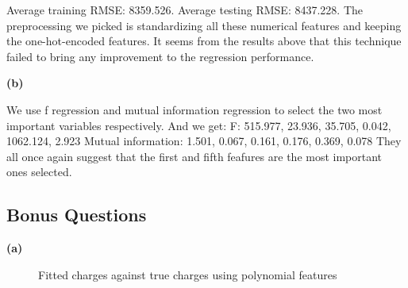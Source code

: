 \documentclass{article}
\begin{document}
Average training RMSE: 8359.526.\newline
\indent Average testing RMSE: 8437.228.\newline
\indent The preprocessing we picked is standardizing all these numerical features and keeping the one-hot-encoded features. It seems from the results above that this technique failed to bring any improvement to the regression performance.\bigbreak

\noindent \textbf{(b)} \bigbreak

We use f regression and mutual information regression to select the two most important variables respectively. And we get:\newline
\indent F: 515.977, 23.936, 35.705, 0.042, 1062.124, 2.923\newline
\indent Mutual information: 1.501, 0.067, 0.161, 0.176, 0.369, 0.078\newline
\indent They all once again suggest that the first and fifth feafures are the most important ones selected.\bigbreak

\subsection{Bonus Questions}

\noindent \textbf{(a)} \bigbreak

\begin{figure}[!htbp]
\centering
{}
\caption{Fitted charges against true charges using polynomial features} \label{3_4_a_1}
\end{figure}
\end{document}
